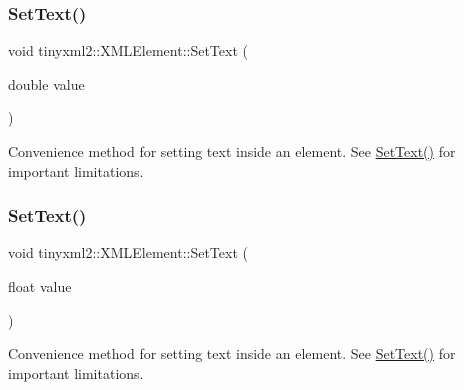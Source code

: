 \mbox{\label{classtinyxml2_1_1_x_m_l_element_a67bd77ac9aaeff58ff20b4275a65ba4e}} 
\subsubsection{\texorpdfstring{Set\+Text()}{SetText()}\hspace{0.1cm}{\footnotesize\ttfamily [6/7]}}
{\footnotesize\ttfamily void tinyxml2\+::\+X\+M\+L\+Element\+::\+Set\+Text (\begin{DoxyParamCaption}\item[{double}]{value }\end{DoxyParamCaption})}



Convenience method for setting text inside an element. See \hyperlink{classtinyxml2_1_1_x_m_l_element_a1f9c2cd61b72af5ae708d37b7ad283ce}{Set\+Text()} for important limitations. 

\mbox{\label{classtinyxml2_1_1_x_m_l_element_a51d560da5ae3ad6b75e0ab9ffb2ae42a}} 
\subsubsection{\texorpdfstring{Set\+Text()}{SetText()}\hspace{0.1cm}{\footnotesize\ttfamily [7/7]}}
{\footnotesize\ttfamily void tinyxml2\+::\+X\+M\+L\+Element\+::\+Set\+Text (\begin{DoxyParamCaption}\item[{float}]{value }\end{DoxyParamCaption})}



Convenience method for setting text inside an element. See \hyperlink{classtinyxml2_1_1_x_m_l_element_a1f9c2cd61b72af5ae708d37b7ad283ce}{Set\+Text()} for important limitations. 

\mbox{\label{classtinyxml2_1_1_x_m_l_element_aafa2807a45b28fe096b29d76e6a13b7c}} 

